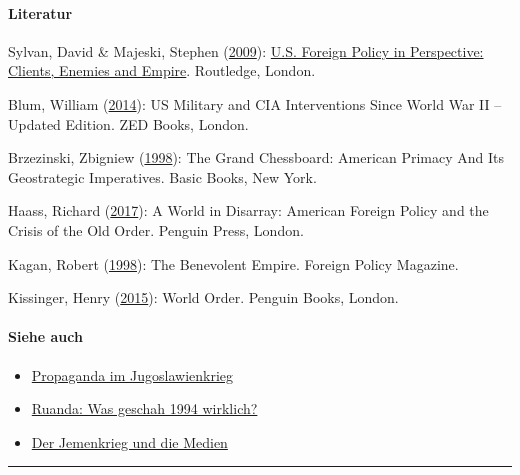 \hypertarget{literatur}{%
\paragraph{Literatur}\label{literatur}}

Sylvan, David \& Majeski, Stephen
(\href{http://www.us-foreign-policy-perspective.org/}{2009}):
\href{http://www.us-foreign-policy-perspective.org/}{U.S. Foreign Policy
in Perspective: Clients, Enemies and Empire}. Routledge, London.

Blum, William
(\href{https://www.zedbooks.net/shop/book/killing-hope/}{2014}): US
Military and CIA Interventions Since World War II -- Updated Edition.
ZED Books, London.

Brzezinski, Zbigniew
(\href{https://archive.org/details/TheGrandChessboardAmericanPrimacyAndItsGeostrategicImperatives1997ZbigniewBrzezinski}{1998}):
The Grand Chessboard: American Primacy And Its Geostrategic Imperatives.
Basic Books, New York.

Haass, Richard (\href{https://www.cfr.org/book/world-disarray}{2017}): A
World in Disarray: American Foreign Policy and the Crisis of the Old
Order. Penguin Press, London.

Kagan, Robert
(\href{http://carnegieendowment.org/1998/06/01/benevolent-empire-pub-275}{1998}):
The Benevolent Empire. Foreign Policy Magazine.

Kissinger, Henry
(\href{https://www.penguinrandomhouse.com/books/316669/world-order-by-henry-kissinger/9780143127710}{2015}):
World Order. Penguin Books, London.

\hypertarget{siehe-auch}{%
\paragraph{Siehe auch}\label{siehe-auch}}

\begin{itemize}
\tightlist
\item
  \href{https://swprs.org/propaganda-im-jugoslawienkrieg/}{Propaganda im
  Jugoslawienkrieg}
\item
  \href{https://swprs.org/ruanda-was-geschah-wirklich/}{Ruanda: Was
  geschah 1994 wirklich?}
\item
  \href{https://swprs.org/jemenkrieg-und-medien/}{Der Jemenkrieg und die
  Medien}
\end{itemize}

\begin{center}\rule{0.5\linewidth}{\linethickness}\end{center}


